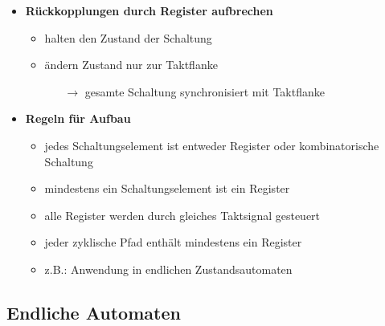 \documentclass[11pt,a4paper]{article}
\begin{document}
\begin{itemize}

\item \textbf{Rückkopplungen durch Register aufbrechen}
	\begin{itemize}
	\item halten den Zustand der Schaltung
	\item ändern Zustand nur zur Taktflanke
		\begin{itemize}
		\item[$\rightarrow$] gesamte Schaltung synchronisiert mit Taktflanke
		\end{itemize}
	
	\end{itemize}

\item \textbf{Regeln für Aufbau}
	\begin{itemize}
	\item jedes Schaltungselement ist entweder Register oder kombinatorische Schaltung
	\item mindestens ein Schaltungselement ist ein Register
	\item alle Register werden durch gleiches Taktsignal gesteuert
	\item jeder zyklische Pfad enthält mindestens ein Register
	\item z.B.: Anwendung in endlichen Zustandsautomaten
	\end{itemize}	 


\end{itemize}

\subsection{Endliche Automaten}
\end{document}
